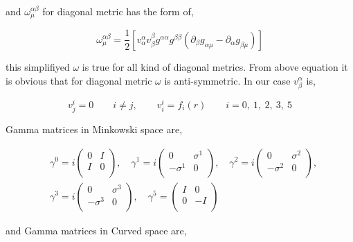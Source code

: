 and $\omega^{\alpha\beta}_{\mu}$ for diagonal metric has the form of,

\begin{equation}
   \omega^{\alpha\beta}_{\mu} = \frac{1}{2}\left[v^{\alpha}_{\alpha}v^{\beta}_{\beta}g^{\alpha\alpha}g^{\beta\beta}(\partial_{\beta}g_{\alpha\mu}-\partial_{\alpha}g_{\beta\mu})\right]
\end{equation}

this simplifiyed $\omega$ is true for all kind of diagonal metrics. From above equation it is obvious that for diagonal metric $\omega$ is anti-symmetric. In our case $v^{\alpha}_{\beta}$ is,

\begin{equation}
   v^{i}_{j} = 0 \qquad i \neq j,    \qquad  v^{i}_{i} = f_i(r)  \qquad i = 0,~1,~2,~3,~5
\end{equation}

Gamma matrices in Minkowski space are,

\begin{align}
   &\gamma^0 = i\begin{pmatrix} 0 & I \\ I & 0 \\ \end{pmatrix}, \quad
   \gamma^1 = i\begin{pmatrix} 0 & \sigma^1 \\ -\sigma^1 & 0 \\ \end{pmatrix}, \quad
   \gamma^2  = i\begin{pmatrix} 0 & \sigma^2 \\ -\sigma^2 & 0 \\ \end{pmatrix}, \nonumber\\
   &\gamma^3 = i\begin{pmatrix} 0 & \sigma^3 \\ -\sigma^3 & 0 \\ \end{pmatrix}, \quad
   \gamma^5  =  \begin{pmatrix} I & 0 \\ 0 & -I \\ \end{pmatrix}
\end{align}

and Gamma matrices in Curved space are,

